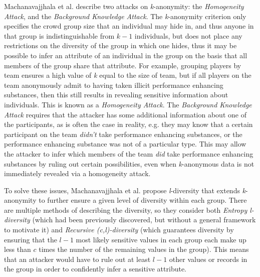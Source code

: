 Machanavajjhala et al. \cite{Machanavajjhala2007} describe two attacks on \textit{k}-anonymity: the \textit{Homogeneity Attack}, and the \textit{Background Knowledge Attack}. The \textit{k}-anonymity criterion only specifies the crowd group size that an individual may hide in, and thus anyone in that group is indistinguishable from $k-1$ individuals, but does not place any restrictions on the diversity of the group in which one hides, thus it may be possible to infer an attribute of an individual in the group on the basis that all members of the group share that attribute. For example, grouping players by team ensures a high value of \textit{k} equal to the size of team, but if all players on the team anonymously admit to having taken illicit performance enhancing substances, then this still results in revealing sensitive information about individuals. This is known as a \textit{Homogeneity Attack}. The \textit{Background Knowledge Attack} requires that the attacker has some additional information about one of the participants, as is often the case in reality, e.g. they may know that a certain participant on the team \textit{didn't} take performance enhancing substances, or the performance enhancing substance was not of a particular type. This may allow the attacker to infer which members of the team \textit{did} take performance enhancing substances by ruling out certain possibilities, even when \textit{k}-anonymous data is not immediately revealed via a homogeneity attack.

To solve these issues, Machanavajjhala et al. propose \textit{l}-diversity that extends \textit{k}-anonymity to further ensure a given level of diversity within each group. There are multiple methods of describing the diversity, so they consider both \textit{Entropy l-diversity} (which had been previously discovered, but without a general framework to motivate it) and \textit{Recursive (c,l)-diversity} (which guarantees diversity by ensuring that the $l-1$ most likely sensitive values in each group each make up less than $c$ times the number of the remaining values in the group). %
This means that an attacker would have to rule out at least $l-1$ other values or records in the group in order to confidently infer a sensitive attribute.
%

